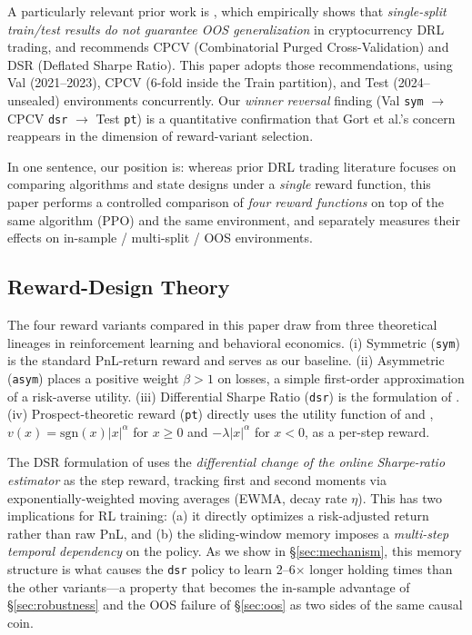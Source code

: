 \documentclass[11pt, a4paper]{article}
\begin{document}
A particularly relevant prior work is \citet{gort2022backtest}, which
empirically shows that \emph{single-split train/test results do not guarantee
OOS generalization} in cryptocurrency DRL trading, and recommends CPCV
(Combinatorial Purged Cross-Validation) and DSR (Deflated Sharpe Ratio). This
paper adopts those recommendations, using Val (2021--2023), CPCV (6-fold inside
the Train partition), and Test (2024-- unsealed) environments concurrently.
Our \emph{winner reversal} finding (Val \texttt{sym} $\to$ CPCV \texttt{dsr}
$\to$ Test \texttt{pt}) is a quantitative confirmation that Gort et al.'s
concern reappears in the dimension of reward-variant selection.

In one sentence, our position is: whereas prior DRL trading literature focuses
on comparing algorithms and state designs under a \emph{single} reward function,
this paper performs a controlled comparison of \emph{four reward functions} on
top of the same algorithm (PPO) and the same environment, and separately
measures their effects on in-sample / multi-split / OOS environments.

\subsection{Reward-Design Theory}
\label{sec:related_reward}

The four reward variants compared in this paper draw from three theoretical
lineages in reinforcement learning and behavioral economics. (i) Symmetric
(\texttt{sym}) is the standard PnL-return reward and serves as our baseline.
(ii) Asymmetric (\texttt{asym}) places a positive weight $\beta>1$ on losses,
a simple first-order approximation of a risk-averse utility. (iii) Differential
Sharpe Ratio (\texttt{dsr}) is the formulation of \citet{moody2001dsr}.
(iv) Prospect-theoretic reward (\texttt{pt}) directly uses the utility function
of \citet{kahneman1979prospect} and \citet{tversky1992cumulative},
$v(x) = \mathrm{sgn}(x) |x|^\alpha$ for $x \geq 0$ and $-\lambda |x|^\alpha$
for $x < 0$, as a per-step reward.

The DSR formulation of \citet{moody2001dsr} uses the \emph{differential change
of the online Sharpe-ratio estimator} as the step reward, tracking first and
second moments via exponentially-weighted moving averages (EWMA, decay rate
$\eta$). This has two implications for RL training: (a) it directly optimizes
a risk-adjusted return rather than raw PnL, and (b) the sliding-window memory
imposes a \emph{multi-step temporal dependency} on the policy. As we show in
\S\ref{sec:mechanism}, this memory structure is what causes the \texttt{dsr}
policy to learn 2--6$\times$ longer holding times than the other variants---a
property that becomes the in-sample advantage of \S\ref{sec:robustness} and
the OOS failure of \S\ref{sec:oos} as two sides of the same causal coin.
\end{document}
